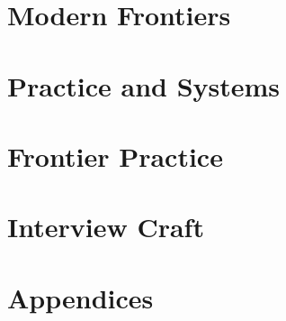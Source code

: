 \documentclass[11pt,twoside]{book}
\begin{document}




\part{Modern Frontiers}






\part{Practice and Systems}





\part{Frontier Practice}





\part{Interview Craft}




\appendix
\part{Appendices}





\backmatter
\end{document}
